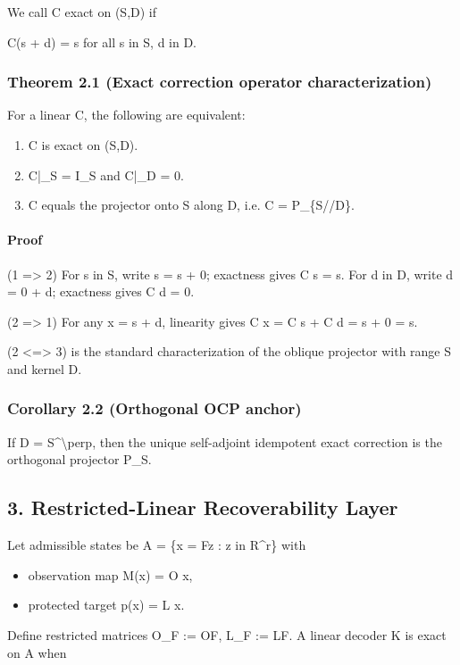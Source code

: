 \documentclass[11pt]{article}
\begin{document}
We call C exact on (S,D) if


C(s + d) = s for all s in S, d in D.


\subsubsection*{Theorem 2.1 (Exact correction operator characterization)}
For a linear C, the following are equivalent:

\begin{enumerate}
\item C is exact on (S,D).
\item C|\_S = I\_S and C|\_D = 0.
\item C equals the projector onto S along D, i.e. C = P\_\{S//D\}.
\end{enumerate}

\paragraph{Proof}
(1 => 2) For s in S, write s = s + 0; exactness gives C s = s. For d in D, write d = 0 + d; exactness gives C d = 0.

(2 => 1) For any x = s + d, linearity gives C x = C s + C d = s + 0 = s.

(2 <=> 3) is the standard characterization of the oblique projector with range S and kernel D.


\subsubsection*{Corollary 2.2 (Orthogonal OCP anchor)}
If D = S\textasciicircum{}\textbackslash{}perp, then the unique self-adjoint idempotent exact correction is the orthogonal projector P\_S.


\subsection*{3. Restricted-Linear Recoverability Layer}
Let admissible states be A = \{x = Fz : z in R\textasciicircum{}r\} with

\begin{itemize}
\item observation map M(x) = O x,
\item protected target p(x) = L x.
\end{itemize}

Define restricted matrices O\_F := OF, L\_F := LF. A linear decoder K is exact on A when
\end{document}
